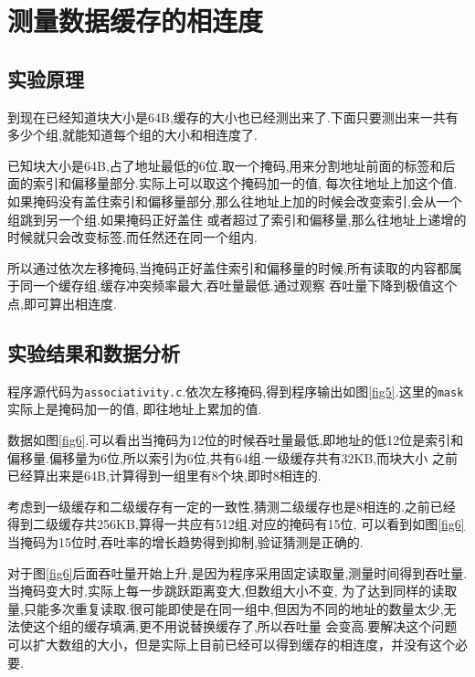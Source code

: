 \documentclass[adobefonts, nocap]{ctexart}
\begin{document}
  \section{测量数据缓存的相连度}
    \subsection{实验原理}
      到现在已经知道块大小是64B,缓存的大小也已经测出来了.下面只要测出来一共有多少个组,就能知道每个组的大小和相连度了.

      已知块大小是64B,占了地址最低的6位.取一个掩码,用来分割地址前面的标签和后面的索引和偏移量部分.实际上可以取这个掩码加一的值,
      每次往地址上加这个值.如果掩码没有盖住索引和偏移量部分,那么往地址上加的时候会改变索引,会从一个组跳到另一个组.如果掩码正好盖住
      或者超过了索引和偏移量,那么往地址上递增的时候就只会改变标签,而任然还在同一个组内.

      所以通过依次左移掩码,当掩码正好盖住索引和偏移量的时候,所有读取的内容都属于同一个缓存组,缓存冲突频率最大,吞吐量最低.通过观察
      吞吐量下降到极值这个点,即可算出相连度.
    \subsection{实验结果和数据分析}
      程序源代码为\texttt{associativity.c}.依次左移掩码,得到程序输出如图\ref{fig5}.这里的\texttt{mask}实际上是掩码加一的值,
      即往地址上累加的值.

      数据如图\ref{fig6}.可以看出当掩码为12位的时候吞吐量最低,即地址的低12位是索引和偏移量.偏移量为6位,所以索引为6位,共有64组.一级缓存共有32KB,而块大小
      之前已经算出来是64B,计算得到一组里有8个块,即时8相连的.

      考虑到一级缓存和二级缓存有一定的一致性,猜测二级缓存也是8相连的.之前已经得到二级缓存共256KB,算得一共应有512组.对应的掩码有15位,
      可以看到如图\ref{fig6}当掩码为15位时,吞吐率的增长趋势得到抑制,验证猜测是正确的.

      对于图\ref{fig6}后面吞吐量开始上升,是因为程序采用固定读取量,测量时间得到吞吐量.当掩码变大时,实际上每一步跳跃距离变大,但数组大小不变,
      为了达到同样的读取量,只能多次重复读取.很可能即使是在同一组中,但因为不同的地址的数量太少,无法使这个组的缓存填满,更不用说替换缓存了,所以吞吐量
      会变高.要解决这个问题可以扩大数组的大小，但是实际上目前已经可以得到缓存的相连度，并没有这个必要.
\end{document}
